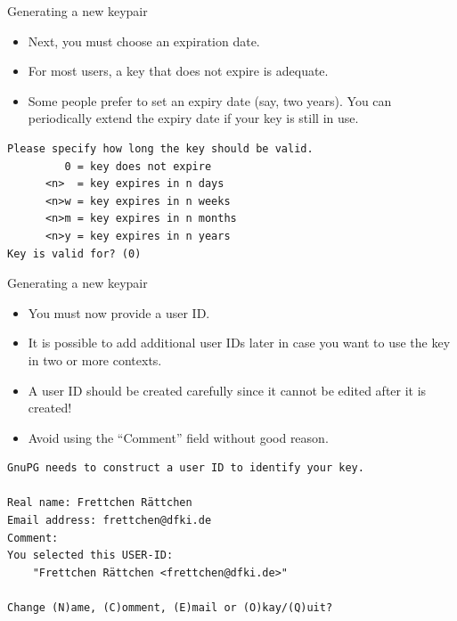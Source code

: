 \documentclass[
mode=present,
paper=smartboard,
size=20pt,
]{powerdot}
\newcommand\vsp{\vspace{-16mm}}
\begin{document}
\begin{slide}[method=direct,toc=]{Generating a new keypair}
  \begin{itemize}
  \item Next, you must choose an expiration date.
  \item For most users, a key that does not expire is adequate.
  \item Some people prefer to set an expiry date (say, two years). You
    can periodically extend the expiry date if your key is still in
    use. %
  \end{itemize}
\begin{verbatim}
Please specify how long the key should be valid.
         0 = key does not expire
      <n>  = key expires in n days
      <n>w = key expires in n weeks
      <n>m = key expires in n months
      <n>y = key expires in n years
Key is valid for? (0)
\end{verbatim}
\end{slide}

\begin{slide}[method=direct,toc=]{Generating a new keypair}
  \begin{itemize}
  \item You must now provide a user ID.
  \item It is possible to add additional user IDs later in case you
    want to use the key in two or more contexts.
  \item A user ID should be created carefully since it cannot be
    edited after it is created!
  \item Avoid using the ``Comment'' field without good reason. %
  \end{itemize}
\vsp
\begin{verbatim}
GnuPG needs to construct a user ID to identify your key.

Real name: Frettchen Rättchen
Email address: frettchen@dfki.de
Comment: 
You selected this USER-ID:
    "Frettchen Rättchen <frettchen@dfki.de>"

Change (N)ame, (C)omment, (E)mail or (O)kay/(Q)uit?
\end{verbatim}
\end{slide}
\end{document}

